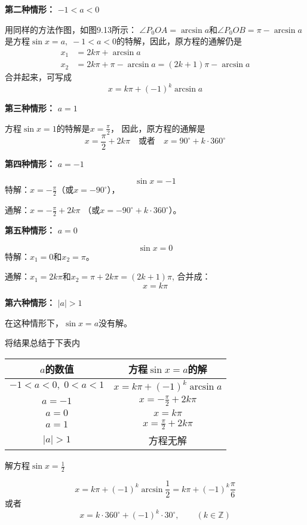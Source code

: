 \textbf{第二种情形：} $-1<a<0$

用同样的方法作图，如图9.13所示：
$\angle P_0OA=\arcsin a$和$\angle P_0OB=\pi-\arcsin a$是方程$\sin x=a,\; -1<a<0$的特解，因此，原方程的通解仍是
\[\begin{split}
  x_1&=2k\pi +\arcsin a\\
x_2&=2k\pi +\pi -\arcsin a=(2k+1)\pi -\arcsin a  
\end{split}\]
合并起来，可写成
\[x=k\pi +(-1)^k\arcsin a\]

\textbf{第三种情形：} $a=1$

方程$\sin x=1$的特解是$x=\frac{\pi}{2}$，
因此，原方程的通解是
\[x=\frac{\pi}{2}+2k\pi\quad \text{或者}\quad x=90^{\circ}+k\cdot 360^{\circ}\]

\textbf{第四种情形：} $a=-1$

\[\sin x=-1\]
特解：$x=-\frac{\pi}{2}$（或$x=-90^{\circ}$），

通解：$x=-\frac{\pi}{2}+2k\pi$ （或$x=-90^{\circ}+k\cdot 360^{\circ}$）。

\textbf{第五种情形：} $a=0$

\[\sin x=0\]
特解：$x_1=0$和$x_2=\pi$。

通解：$x_1=2k\pi$和$x_2=\pi +2k\pi =(2k+1)\pi$,
合并成：\[x=k\pi\]

\textbf{第六种情形：} $|a|>1$

在这种情形下，$\sin x=a$没有解。

将结果总结于下表内
\begin{center}
\begin{tabular}{c|c}
    \hline
$a$的数值& 方程$\sin x=a$的解\\
    \hline
$-1<a<0,\; 0<a<1$ & $x=k\pi +(-1)^k\arcsin a$\\
$a=-1$& $x=-\frac{\pi}{2}+2k\pi$\\
$a=0$&   $x=k\pi$\\
$a=1$& $x=\frac{\pi}{2}+2k\pi$\\
$|a|>1$ & 方程无解\\
    \hline
\end{tabular}   
\end{center}

\begin{example}
    解方程$\sin x=\frac{1}{2} $
\end{example}

\begin{solution}
    \[x=k\pi+(-1)^k\arcsin\frac{1}{2}=k\pi+(-1)^k\frac{\pi}{6}\]
    或者\[x=k\cdot 360^{\circ}+(-1)^k\cdot 30^{\circ},\qquad (k\in\mathbb{Z})\]
\end{solution}


